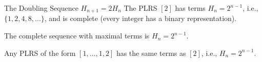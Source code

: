 \documentclass[handout]{beamer}
\begin{document}
\begin{frame}{The Doubling Sequence $H_{n+1} = 2H_n$}
    The PLRS $[2]$ has terms $H_n = 2^{n - 1}$, i.e., $\{1,2,4,8,\ldots\}$, and is complete (every integer has a binary representation).
    \pause
    \bigskip
    \begin{theorem}[Brown]
    The complete sequence with maximal terms is $H_n= 2^{n-1}$.
    \end{theorem}
    \pause
    \bigskip
    Any PLRS of the form $[1, \ldots, 1, 2]$ has the same terms as $[2]$, i.e., $H_n = 2^{n - 1}$.
\end{frame}
    
    
\end{document}
